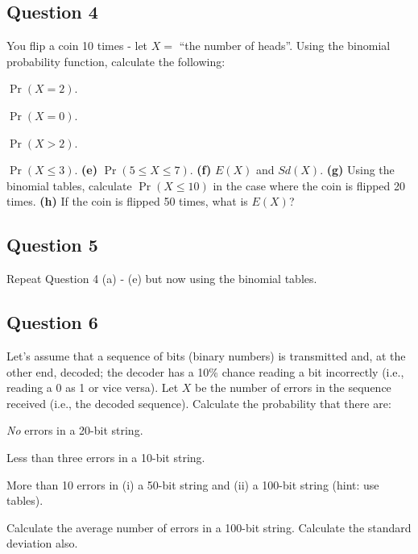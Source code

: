 
\subsection*{Question 4}

You flip a coin 10 times - let $X =$ ``the number of heads''. Using the binomial probability function, calculate the following:\\[-0.2cm]

\item  $\Pr(X = 2)$. 
 \item  $\Pr(X = 0)$. 
 \item   $\Pr(X > 2)$. 
 \item  $\Pr(X \le 3)$. 
 {\bf(e)} $\Pr(5 \le X \le 7)$.  
 {\bf(f)} $E(X)$ and $Sd(X)$. 
 {\bf(g)} Using the binomial tables, calculate $\Pr(X \le10)$ in the case where the coin is flipped 20 times. 
 {\bf(h)} If the coin is flipped 50 times, what is $E(X)$?

\subsection*{Question 5}

Repeat Question 4 (a) - (e) but now using the binomial tables.



\subsection*{Question 6}

Let's assume that a sequence of bits (binary numbers) is transmitted and, at the other end, decoded; the decoder has a 10\% chance reading a bit incorrectly (i.e., reading a 0 as 1 or vice versa). Let $X$ be the number of errors in the sequence received (i.e., the decoded sequence). Calculate the probability that there are: \\[-0.2cm]

\item  \emph{No} errors in a 20-bit string. 
 \item  Less than three errors in a 10-bit string. 
 \item  More than 10 errors in (i) a 50-bit string and (ii) a 100-bit string (hint: use tables). 
 \item  Calculate the average number of errors in a 100-bit string. Calculate the standard deviation also.


